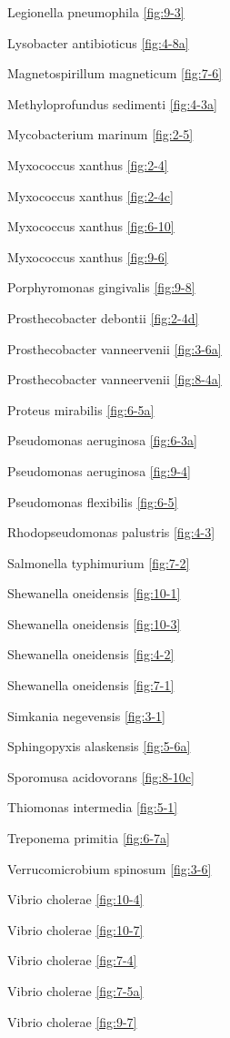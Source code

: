 \documentclass[]{tufte-book}
\begin{document}
Legionella pneumophila \ref{fig:9-3}

Lysobacter antibioticus \ref{fig:4-8a}

Magnetospirillum magneticum \ref{fig:7-6}

Methyloprofundus sedimenti \ref{fig:4-3a}

Mycobacterium marinum \ref{fig:2-5}

Myxococcus xanthus \ref{fig:2-4}

Myxococcus xanthus \ref{fig:2-4c}

Myxococcus xanthus \ref{fig:6-10}

Myxococcus xanthus \ref{fig:9-6}

Porphyromonas gingivalis \ref{fig:9-8}

Prosthecobacter debontii \ref{fig:2-4d}

Prosthecobacter vanneervenii \ref{fig:3-6a}

Prosthecobacter vanneervenii \ref{fig:8-4a}

Proteus mirabilis \ref{fig:6-5a}

Pseudomonas aeruginosa \ref{fig:6-3a}

Pseudomonas aeruginosa \ref{fig:9-4}

Pseudomonas flexibilis \ref{fig:6-5}

Rhodopseudomonas palustris \ref{fig:4-3}

Salmonella typhimurium \ref{fig:7-2}

Shewanella oneidensis \ref{fig:10-1}

Shewanella oneidensis \ref{fig:10-3}

Shewanella oneidensis \ref{fig:4-2}

Shewanella oneidensis \ref{fig:7-1}

Simkania negevensis \ref{fig:3-1}

Sphingopyxis alaskensis \ref{fig:5-6a}

Sporomusa acidovorans \ref{fig:8-10c}

Thiomonas intermedia \ref{fig:5-1}

Treponema primitia \ref{fig:6-7a}

Verrucomicrobium spinosum \ref{fig:3-6}

Vibrio cholerae \ref{fig:10-4}

Vibrio cholerae \ref{fig:10-7}

Vibrio cholerae \ref{fig:7-4}

Vibrio cholerae \ref{fig:7-5a}

Vibrio cholerae \ref{fig:9-7}
\end{document}
